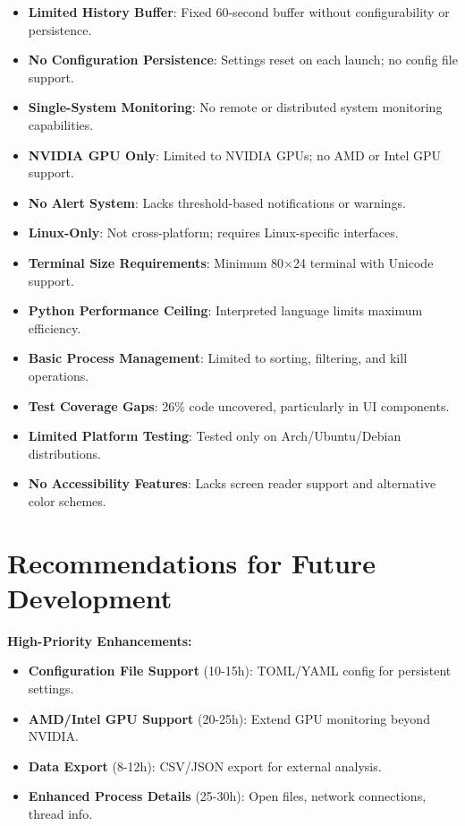 \documentclass[12pt,a4paper,oneside]{report}
\begin{document}
\begin{itemize}
    \item \textbf{Limited History Buffer}: Fixed 60-second buffer without configurability or persistence.
    
    \item \textbf{No Configuration Persistence}: Settings reset on each launch; no config file support.
    
    \item \textbf{Single-System Monitoring}: No remote or distributed system monitoring capabilities.
    
    \item \textbf{NVIDIA GPU Only}: Limited to NVIDIA GPUs; no AMD or Intel GPU support.
    
    \item \textbf{No Alert System}: Lacks threshold-based notifications or warnings.
    
    \item \textbf{Linux-Only}: Not cross-platform; requires Linux-specific interfaces.
    
    \item \textbf{Terminal Size Requirements}: Minimum 80×24 terminal with Unicode support.
    
    \item \textbf{Python Performance Ceiling}: Interpreted language limits maximum efficiency.
    
    \item \textbf{Basic Process Management}: Limited to sorting, filtering, and kill operations.
    
    \item \textbf{Test Coverage Gaps}: 26\% code uncovered, particularly in UI components.
    
    \item \textbf{Limited Platform Testing}: Tested only on Arch/Ubuntu/Debian distributions.
    
    \item \textbf{No Accessibility Features}: Lacks screen reader support and alternative color schemes.
\end{itemize}

\section{Recommendations for Future Development}
\label{sec:recommendations}

\textbf{High-Priority Enhancements:}
\begin{itemize}
    \item \textbf{Configuration File Support} (10-15h): TOML/YAML config for persistent settings.
    
    \item \textbf{AMD/Intel GPU Support} (20-25h): Extend GPU monitoring beyond NVIDIA.
    
    \item \textbf{Data Export} (8-12h): CSV/JSON export for external analysis.
    
    \item \textbf{Enhanced Process Details} (25-30h): Open files, network connections, thread info.
\end{itemize}
\end{document}
